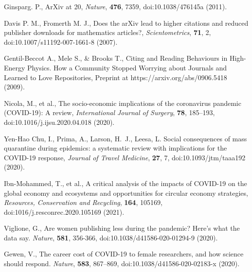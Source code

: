 \documentclass[]{rsos}%
\begin{document}
\begin{thebibliography}{10}

{Ginsparg}. P., {ArXiv at 20}, \emph{Nature}, \textbf{476}, 7359, doi:10.1038/476145a \newblock (2011).


{Davis P. M., Fromerth M. J.,} {Does the arXiv lead to higher citations and reduced publisher downloads for mathematics articles?}, \emph{Scientometrics}, \textbf{71}, 2, doi:10.1007/s11192-007-1661-8 \newblock (2007).

{Gentil-Beccot A., Mele S., \& Brooks T.,} {Citing and Reading Behaviours in High-Energy Physics. How a Community Stopped Worrying about Journals and Learned to Love Repositories}, Preprint at https://arxiv.org/abs/0906.5418 \newblock (2009).


{Nicola, M., et al.,} {The socio-economic implications of the coronavirus pandemic ({COVID}-19): A review}, \emph{International Journal of Surgery}, \textbf{78}, 185--193, doi:10.1016/j.ijsu.2020.04.018 \newblock (2020).

{Yen-Hao Chu, I., Prima, A., Larson, H.~J., Leesa, L.}
{Social consequences of mass quarantine during epidemics: a systematic review with implications for the {COVID}-19 response}, \emph{Journal of Travel Medicine}, \textbf{27}, 7, doi:10.1093/jtm/taaa192 \newblock (2020).

{Ibn-Mohammed, T., et al.,} {A critical analysis of the impacts of {COVID}-19 on the global economy and ecosystems and opportunities for circular economy strategies}, \emph{Resources, Conservation and Recycling}, \textbf{164}, 105169, doi:1016/j.resconrec.2020.105169 \newblock (2021).


{Viglione, G.}, {Are women publishing less during the pandemic? Here's what the data say}. \emph{Nature}, \textbf{581}, 356-366, doi:10.1038/d41586-020-01294-9 \newblock (2020).


{Gewen, V.}, {The career cost of COVID-19 to female researchers, and how science should respond}. \emph{Nature}, \textbf{583}, 867--869, doi:10.1038/d41586-020-02183-x \newblock (2020).




\end{thebibliography}
\end{document}
